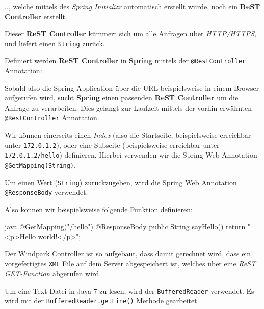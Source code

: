 .., welche mittels des \textit{Spring Initializr} automatisch erstellt wurde, noch ein \textbf{ReST Controller} erstellt.

Dieser \textbf{ReST Controller} kümmert sich um alle Anfragen über \textit{HTTP/HTTPS}, und liefert einen \texttt{String} zurück.

Definiert werden \textbf{ReST Controller} in \textbf{Spring} mittels der \texttt{@RestController} Annotation:

\begin{code}{java}
    @RestController
    public class WindparkRestController {
\end{code}

Sobald also die Spring Application über die URL beispielsweise in einem Browser aufgerufen wird, sucht \textbf{Spring} einen passenden \textbf{ReST Controller} um die Anfrage zu verarbeiten. Dies gelangt zur Laufzeit mittels der vorhin erwähnten \texttt{@RestController} Annotation.

Wir können einerseits einen \textit{Index} (also die Startseite, beispielsweise erreichbar unter \texttt{172.0.1.2}), oder eine Subseite (beispielsweise erreichbar unter \texttt{172.0.1.2/hello}) definieren. Hierbei verwenden wir die Spring Web Annotation \texttt{@GetMapping(String)}.

Um einen Wert (\texttt{String}) zurückzugeben, wird die Spring Web Annotation {\texttt{@ResponseBody}} verwendet.

Also können wir beispielsweise folgende Funktion definieren:

\begin{code}{java}
    @GetMapping("/hello")
    @ResponseBody
    public String sayHello() {
        return "<p>Hello world!</p>";
    }
\end{code}

Der Windpark Controller ist so aufgebaut, dass damit gerechnet wird, dass ein vorgefertigtes \texttt{XML} File auf dem Server abgespeichert ist, welches über eine \textit{ReST GET-Function} abgerufen wird.

Um eine Text-Datei in Java 7 zu lesen, wird der \texttt{BufferedReader} verwendet. Es wird mit der \texttt{BufferedReader.getLine()} Methode gearbeitet.

